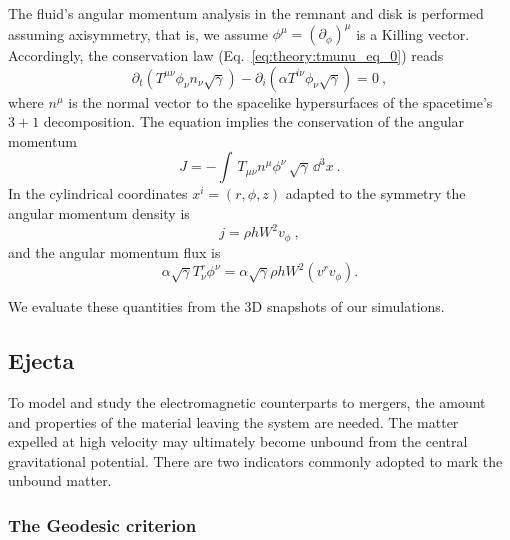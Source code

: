 The fluid's angular momentum analysis in the remnant and disk is performed
assuming axisymmetry,
that is, we assume $\phi^{\mu} = (\partial_{\phi})^{\mu}$ is a Killing
vector. Accordingly, the conservation law (Eq.~\eqref{eq:theory:tmunu_eq_0}) 
reads
%
\begin{equation}
\partial_t(T^{\mu\nu}\phi_{\nu}n_{\nu}\sqrt{\gamma}) -
\partial_i(\alpha T^{i \nu}\phi_{\nu}\sqrt{\gamma}) = 0 \ ,
\end{equation}
%
where $n^\mu$ is the normal vector to the spacelike hypersurfaces of
the spacetime's $3+1$ decomposition.
%
The equation implies the conservation of the angular momentum 
\begin{equation}
J = %
-\int \,
T_{\mu\nu}n^{\mu}\phi^{\nu}\,\sqrt{\gamma}\, \dd^3 x\ .
\end{equation}
%
In the cylindrical coordinates $x^i=(r,\phi,z)$ adapted to the symmetry
the angular momentum density is  
%
\begin{equation}
j = %
\rho h W^2 v_{\phi} \ ,
\label{eq:method:ang_mom}
\end{equation}
%
and the angular momentum flux is 
%
\begin{equation}
\alpha\sqrt{\gamma}T^r _{\nu}\phi^{\nu} =
\alpha\sqrt{\gamma}\rho h W^2 (v^{r}v_{\phi}) .
\end{equation}

We evaluate these quantities from the 3D snapshots of our simulations.




\subsection{Ejecta} \label{sec:bns_sims:method:ejecta}

To model and study the electromagnetic counterparts to mergers, the amount and properties 
of the material leaving the system are needed.
The matter expelled at high velocity may ultimately become unbound from the 
central gravitational potential. 
There are two indicators commonly adopted to mark the unbound matter.

\subsubsection{The Geodesic criterion}

